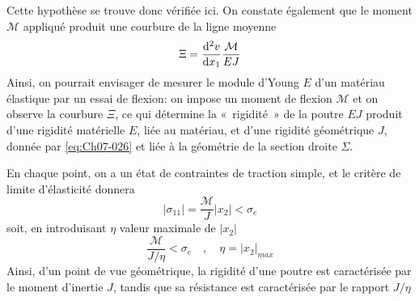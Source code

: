 Cette hypothèse se trouve donc vérifiée ici.
On constate également que le moment $\mathcal{M}$ appliqué produit une courbure de la ligne moyenne
\begin{equation}
    \Xi = \frac{\mathrm{d}^2 v}{\mathrm{d} x_1} \frac{\mathcal{M}}{EJ}
    \label{eq:Ch07-034}
\end{equation}
Ainsi, on pourrait envisager de mesurer le module d'Young $E$ d'un matériau élastique par un essai de flexion: on impose un moment de flexion $\mathcal{M}$ et on observe la courbure $\Xi$, ce qui détermine la «~rigidité~» de la poutre $EJ$ produit d'une rigidité matérielle $E$, liée au matériau, et d'une rigidité géométrique $J$, donnée par \eqref{eq:Ch07-026} et liée à la géométrie de la section droite $\Sigma$.

En chaque point, on a un état de contraintes de traction simple, et le critère de limite d'élasticité donnera 
\begin{equation}
    \left|\sigma_{11}\right| = \frac{\mathcal{M}}{J} \left|x_2\right| < \sigma_e
    \label{eq:Ch07-035}
\end{equation}
soit, en introduisant $\eta$ valeur maximale de $\left|x_2\right|$
\begin{equation}
    \frac{\mathcal{M}}{J/\eta} < \sigma_e \quad , \quad \eta = \left|x_2\right|_{max}
    \label{eq:Ch07-036}
\end{equation}
Ainsi, d'un point de vue géométrique, la rigidité d'une poutre est caractérisée  par le moment  d'inertie $J$,  tandis que sa résistance est caractérisée par le rapport $J/\eta$

